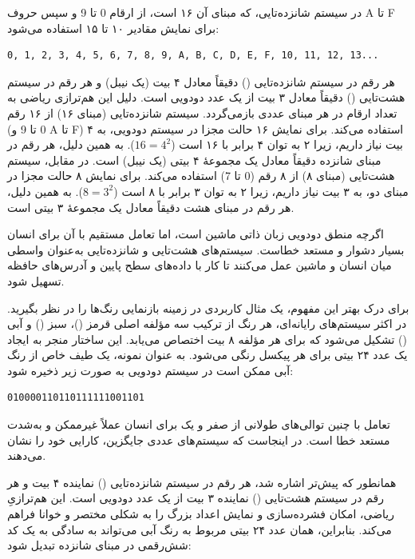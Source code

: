 در سیستم شانزده‌تایی، که مبنای آن ۱۶ است، از ارقام 0 تا 9 و سپس حروف A تا F برای نمایش مقادیر ۱۰ تا ۱۵ استفاده می‌شود:

\begin{latin}
\begin{lstlisting}
0, 1, 2, 3, 4, 5, 6, 7, 8, 9, A, B, C, D, E, F, 10, 11, 12, 13...
\end{lstlisting}
\end{latin}

هر رقم در سیستم شانزده‌تایی () دقیقاً معادل ۴ بیت (یک نیبل) و هر رقم در سیستم هشت‌تایی () دقیقاً معادل ۳ بیت از یک عدد دودویی است. دلیل این هم‌ترازی ریاضی به تعداد ارقام در هر مبنای عددی بازمی‌گردد. سیستم شانزده‌تایی (مبنای ۱۶) از ۱۶ رقم (0 تا 9 و A تا F) استفاده می‌کند. برای نمایش ۱۶ حالت مجزا در سیستم دودویی، به ۴ بیت نیاز داریم، زیرا ۲ به توان ۴ برابر با ۱۶ است ($16=4^2$). به همین دلیل، هر رقم در مبنای شانزده دقیقاً معادل یک مجموعهٔ ۴ بیتی (یک نیبل) است. در مقابل، سیستم هشت‌تایی (مبنای ۸) از ۸ رقم (0 تا 7) استفاده می‌کند. برای نمایش ۸ حالت مجزا در مبنای دو، به ۳ بیت نیاز داریم، زیرا ۲ به توان ۳ برابر با ۸ است ($8=3^2$). به همین دلیل، هر رقم در مبنای هشت دقیقاً معادل یک مجموعهٔ ۳ بیتی است.

اگرچه منطق دودویی زبان ذاتی ماشین است، اما تعامل مستقیم با آن برای انسان بسیار دشوار و مستعد خطاست. سیستم‌های هشت‌تایی و شانزده‌تایی به‌عنوان واسطی میان انسان و ماشین عمل می‌کنند تا کار با داده‌های سطح پایین و آدرس‌های حافظه تسهیل شود.

برای درک بهتر این مفهوم، یک مثال کاربردی در زمینه بازنمایی رنگ‌ها را در نظر بگیرید. در اکثر سیستم‌های رایانه‌ای، هر رنگ از ترکیب سه مؤلفه اصلی قرمز ()، سبز () و آبی () تشکیل می‌شود که برای هر مؤلفه ۸ بیت اختصاص می‌یابد. این ساختار منجر به ایجاد یک عدد ۲۴ بیتی برای هر پیکسل رنگی می‌شود. به عنوان نمونه، یک طیف خاص از رنگ آبی ممکن است در سیستم دودویی به صورت زیر ذخیره شود:

\begin{latin}
\begin{lstlisting}
010000110110111111001101
\end{lstlisting}
\end{latin}

تعامل با چنین توالی‌های طولانی از صفر و یک برای انسان عملاً غیرممکن و به‌شدت مستعد خطا است. در اینجاست که سیستم‌های عددی جایگزین، کارایی خود را نشان می‌دهند.

همانطور که پیش‌تر اشاره شد، هر رقم در سیستم شانزده‌تایی () نماینده ۴ بیت و هر رقم در سیستم هشت‌تایی () نماینده ۳ بیت از یک عدد دودویی است. این هم‌ترازیِ ریاضی، امکان فشرده‌سازی و نمایش اعداد بزرگ را به شکلی مختصر و خوانا فراهم می‌کند. بنابراین، همان عدد ۲۴ بیتی مربوط به رنگ آبی می‌تواند به سادگی به یک کد شش‌رقمی در مبنای شانزده تبدیل شود:

